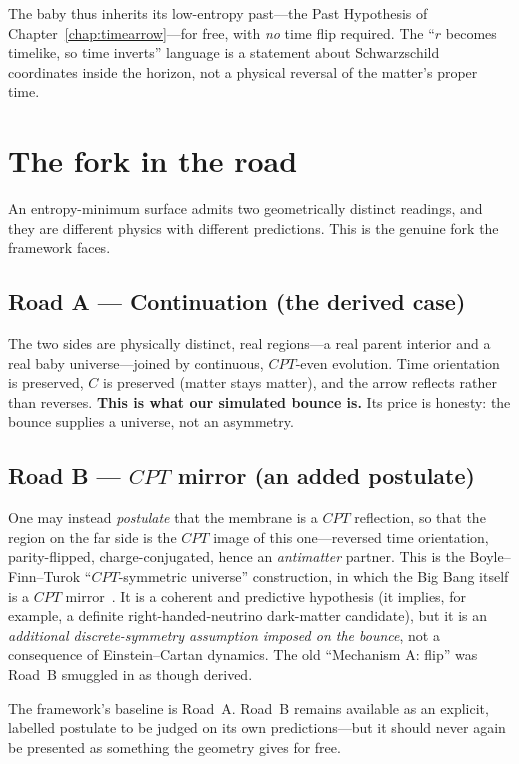 The baby thus inherits its low-entropy past---the Past Hypothesis of
Chapter~\ref{chap:timearrow}---for free, with \emph{no} time flip required. The
``$r$ becomes timelike, so time inverts'' language is a statement about
Schwarzschild coordinates inside the horizon, not a physical reversal of the
matter's proper time.

\section{The fork in the road}

An entropy-minimum surface admits two geometrically distinct readings, and they
are different physics with different predictions. This is the genuine fork the
framework faces.

\subsection*{Road A --- Continuation (the derived case)}

The two sides are physically distinct, real regions---a real parent interior and
a real baby universe---joined by continuous, $CPT$-even evolution. Time
orientation is preserved, $C$ is preserved (matter stays matter), and the arrow
reflects rather than reverses. \textbf{This is what our simulated bounce is.} Its
price is honesty: the bounce supplies a universe, not an asymmetry.

\subsection*{Road B --- $CPT$ mirror (an added postulate)}

One may instead \emph{postulate} that the membrane is a $CPT$ reflection, so that
the region on the far side is the $CPT$ image of this one---reversed time
orientation, parity-flipped, charge-conjugated, hence an \emph{antimatter}
partner. This is the Boyle--Finn--Turok ``$CPT$-symmetric universe''
construction, in which the Big Bang itself is a $CPT$ mirror~\citep{boyle2018}.
It is a coherent and predictive hypothesis (it implies, for example, a definite
right-handed-neutrino dark-matter candidate), but it is an \emph{additional
discrete-symmetry assumption imposed on the bounce}, not a consequence of
Einstein--Cartan dynamics. The old ``Mechanism A: flip'' was Road~B smuggled in
as though derived.

\medskip
\noindent The framework's baseline is Road~A. Road~B remains available as an
explicit, labelled postulate to be judged on its own predictions---but it should
never again be presented as something the geometry gives for free.

